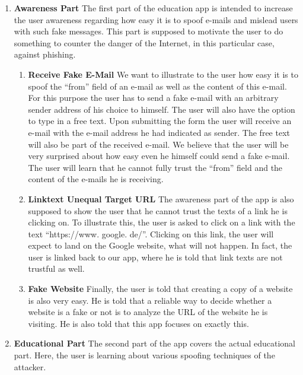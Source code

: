 \begin{enumerate}
	\item \textbf{Awareness Part} The first part of the education app is intended to increase the user awareness regarding how easy it is to spoof e-mails and mislead users with such fake messages.
 This part is supposed to motivate the user to do something to counter the danger of the Internet, in this particular case, against phishing.

\begin{enumerate}
		\item \textbf{Receive Fake E-Mail} We want to illustrate to the user how easy it is to spoof the ``from'' field of an e-mail as well as the content of this e-mail.
 For this purpose the user has to send a fake e-mail with an arbitrary sender address of his choice to himself.
 The user will also have the option to type in a free text.
 Upon submitting the form the user will receive an e-mail with the e-mail address he had indicated as sender.
 The free text will also be part of the received e-mail.
 We believe that the user will be very surprised about how easy even he himself could send a fake e-mail.
 The user will learn that he cannot fully trust the ``from'' field and the content of the e-mails he is receiving.

		\item \textbf{Linktext Unequal Target URL} The awareness part of the app is also supposed to show the user that he cannot trust the texts of a link he is clicking on.
 To illustrate this, the user is asked to click on a link with the text ``https://www.
google.
de/''. Clicking on this link, the user will expect to land on the Google website, what will not happen.
 In fact, the user is linked back to our app, where he is told that link texts are not trustful as well.
 
	\item \textbf{Fake Website} Finally, the user is told that creating a copy of a website is also very easy.
 He is told that a reliable way to decide whether a website is a fake or not is to analyze the URL of the website he is visiting.
 He is also told that this app focuses on exactly this.

\end{enumerate}
	\item \textbf{Educational Part} The second part of the app covers the actual educational part.
 Here, the user is learning about various spoofing techniques of the attacker.


\end{enumerate}
